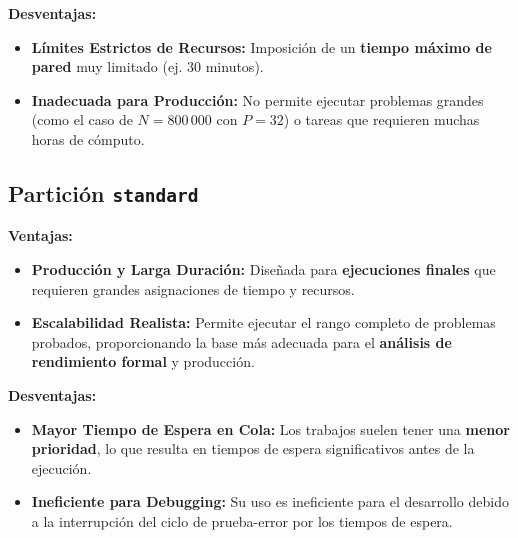 \documentclass{article}
\begin{document}
\textbf{Desventajas:}
\begin{itemize}
    \item \textbf{Límites Estrictos de Recursos:} Imposición de un \textbf{tiempo máximo de pared} muy limitado (ej. 30 minutos).
    \item \textbf{Inadecuada para Producción:} No permite ejecutar problemas grandes (como el caso de $N=800\,000$ con $P=32$) o tareas que requieren muchas horas de cómputo.
\end{itemize}

\subsection{Partición \texttt{standard}}
\textbf{Ventajas:}
\begin{itemize}
    \item \textbf{Producción y Larga Duración:} Diseñada para \textbf{ejecuciones finales} que requieren grandes asignaciones de tiempo y recursos.
    \item \textbf{Escalabilidad Realista:} Permite ejecutar el rango completo de problemas probados, proporcionando la base más adecuada para el \textbf{análisis de rendimiento formal} y producción.
\end{itemize}

\textbf{Desventajas:}
\begin{itemize}
    \item \textbf{Mayor Tiempo de Espera en Cola:} Los trabajos suelen tener una \textbf{menor prioridad}, lo que resulta en tiempos de espera significativos antes de la ejecución.
    \item \textbf{Ineficiente para Debugging:} Su uso es ineficiente para el desarrollo debido a la interrupción del ciclo de prueba-error por los tiempos de espera.
\end{itemize}
\end{document}
